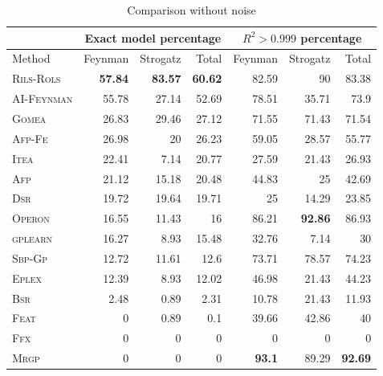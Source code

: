 \documentclass[a4paper,12pt]{elsarticle}
\begin{document}
\begin{table}[!htb]
	\caption{Comparison without noise}\label{tab:comp_noise0}
	\centering
	\begin{tabular}{l|rrr|rrr} \hline
		& \multicolumn{3}{c|}{Exact model percentage} & \multicolumn{3}{c}{$R^2 > 0.999$ percentage}\\ \hline
		Method & Feynman & Strogatz & Total & Feynman & Strogatz & Total \\ \hline
		\textsc{Rils-Rols}&\bf{57.84}&\bf{83.57}&\bf{60.62}&82.59&90&83.38\\
		\textsc{AI-Feynman} &55.78&27.14&52.69&78.51&35.71&73.9\\
		\textsc{Gomea} &26.83&29.46&27.12&71.55&71.43&71.54\\
		\textsc{Afp-Fe} &26.98&20&26.23&59.05&28.57&55.77\\
		\textsc{Itea}&22.41&7.14&20.77&27.59&21.43&26.93\\
		\textsc{Afp}&21.12&15.18&20.48&44.83&25&42.69\\
		\textsc{Dsr}&19.72&19.64&19.71&25&14.29&23.85\\
		\textsc{Operon}&16.55&11.43&16&86.21&\bf{92.86}&86.93\\
		\textsc{gplearn}&16.27&8.93&15.48&32.76&7.14&30\\
		\textsc{Sbp-Gp}&12.72&11.61&12.6&73.71&78.57&74.23\\
		\textsc{Eplex}  &12.39&8.93&12.02&46.98&21.43&44.23\\
		\textsc{Bsr}&2.48&0.89&2.31&10.78&21.43&11.93\\
		\textsc{Feat}&0&0.89&0.1&39.66&42.86&40\\
		\textsc{Ffx}&0&0&0&0&0&0\\
		\textsc{Mrgp}&0&0&0&\bf{93.1}&89.29&\bf{92.69}\\
		\hline
	\end{tabular}
\end{table}
\end{document}
